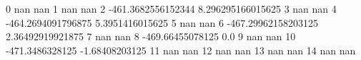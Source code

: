 0 nan nan
1 nan nan
2 -461.3682556152344 8.296295166015625
3 nan nan
4 -464.2694091796875 5.3951416015625
5 nan nan
6 -467.29962158203125 2.36492919921875
7 nan nan
8 -469.66455078125 0.0
9 nan nan
10 -471.3486328125 -1.68408203125
11 nan nan
12 nan nan
13 nan nan
14 nan nan

